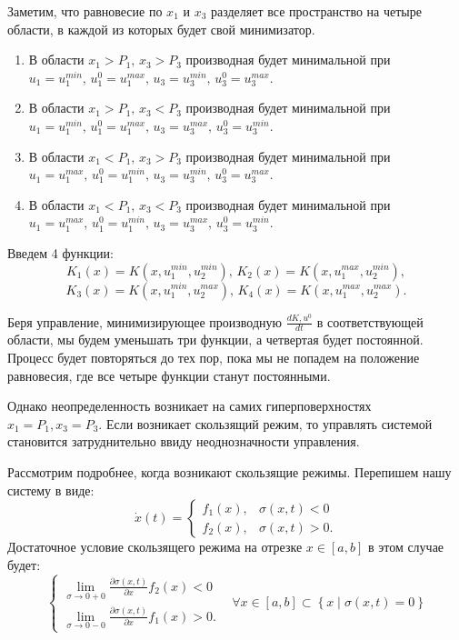 \documentclass[11pt]{article}
\newcommand\Set[2]{\left\{ #1 \mid #2 \right\}}
\newcommand\dd[2]{\frac{\partial#1}{\partial#2}}
\begin{document}
Заметим, что равновесие по $x_1$ и $x_3$ разделяет все пространство на четыре области, в каждой из которых будет свой минимизатор.
\begin{enumerate}
\item
	В области $x_1 > P_1, \, x_3 > P_3$ производная будет минимальной при $u_1 = u_1^{min}, \, u_1^0 = u_1^{max}, \, u_3 = u_3^{min}, \, u_3^0 = u_3^{max}.$
\item
	В области $x_1 > P_1, \, x_3 < P_3$ производная будет минимальной при $u_1 = u_1^{min}, \, u_1^0 = u_1^{max}, \, u_3 = u_3^{max}, \, u_3^0 = u_3^{min}.$
\item
	В области $x_1 < P_1, \, x_3 > P_3$ производная будет минимальной при $u_1 = u_1^{max}, \, u_1^0 = u_1^{min}, \, u_3 = u_3^{min}, \, u_3^0 = u_3^{max}.$
\item
	В области $x_1 < P_1, \, x_3 < P_3$ производная будет минимальной при $u_1 = u_1^{max}, \, u_1^0 = u_1^{min}, \, u_3 = u_3^{max}, \, u_3^0 = u_3^{min}.$
\end{enumerate}

Введем 4 функции:
$$K_1(x) = K(x,u_1^{min}, u_2^{min}), \, K_2(x) = K(x,u_1^{max}, u_2^{min}),$$ 
$$K_3(x) = K(x,u_1^{min}, u_2^{max}), \, K_4(x) = K(x,u_1^{max}, u_2^{max}).$$

Беря управление, минимизирующее производную $\frac{dK, u^0}{dt}$ в соответствующей области, мы будем уменьшать три функции, а четвертая будет постоянной. Процесс будет повторяться до тех пор, пока мы не попадем на положение равновесия, где все четыре функции станут постоянными.


Однако неопределенность возникает на самих гиперповерхностях $x_1 = P_1, x_3 = P_3.$ Если возникает скользящий режим, то управлять системой становится затруднительно ввиду неоднозначности управления. 

Рассмотрим подробнее, когда возникают скользящие режимы. Перепишем нашу систему в виде:
$$\dot x(t) = \begin{cases} f_1(x), & \sigma(x,t) < 0 \\ f_2(x), & \sigma(x,t) > 0.\end{cases}$$
Достаточное условие скользящего режима на отрезке $x \in [a, b]$ в этом случае будет:
$$
\left\{
\begin{aligned}
    \lim_{\sigma \to 0+0}\dd{\sigma(x,t)}{x} f_2(x) < 0 \\
    \lim_{\sigma \to 0-0} \dd{\sigma(x,t)}{x} f_1(x) > 0.
\end{aligned}
\right.
\;\;\; \forall x \in [a, b] \subset \Set{x}{\sigma(x,t) = 0}
$$
\end{document}
